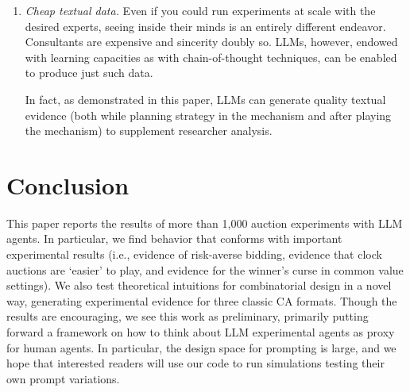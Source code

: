 \documentclass{article} %
\begin{document}
\begin{enumerate}

    \item \textit{Cheap textual data.} Even if you could run experiments at scale with the desired experts, seeing inside their minds is an entirely different endeavor.
    Consultants are expensive and sincerity doubly so. 
    LLMs, however, endowed with learning capacities as with chain-of-thought techniques, can be enabled to produce just such data.

    In fact, as demonstrated in this paper, LLMs can generate quality textual evidence (both while planning strategy in the mechanism and after playing the mechanism) to supplement researcher analysis. 
\end{enumerate}







\section{Conclusion}
This paper reports the results of more than 1,000 auction experiments with LLM agents. 
In particular, we find behavior that conforms with important experimental results (i.e., evidence of risk-averse bidding, evidence that clock auctions are `easier' to play, and evidence for the winner's curse in common value settings). 
We also test theoretical intuitions for combinatorial design in a novel way, generating experimental evidence for three classic CA formats. 
Though the results are encouraging, we see this work as preliminary,
primarily putting forward a framework on how to think about LLM experimental agents as proxy for human agents.
 In particular, the design space for prompting is large, and we hope that interested readers
 will use our code to run simulations testing their own prompt variations. 
\end{document}
